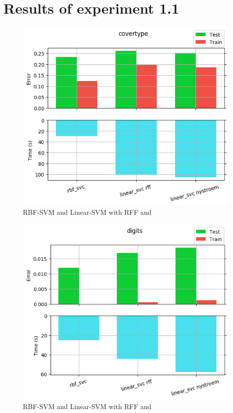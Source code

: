 
\chapter{Results of experiment 1.1} %

\label{Appendix1-1} %

\begin{figure}[th]
\centering
\includegraphics[scale=\imgscale]{Figures/1_1/covertype}
\decoRule
\caption[1.1 covertype]{RBF-SVM and Linear-SVM with RFF and \Nys}
\label{fig:1_1_covertype}
\end{figure}

\begin{figure}[th]
\centering
\includegraphics[scale=\imgscale]{Figures/1_1/digits}
\decoRule
\caption[1.1 digits]{RBF-SVM and Linear-SVM with RFF and \Nys}
\label{fig:1_1_digits}
\end{figure}

